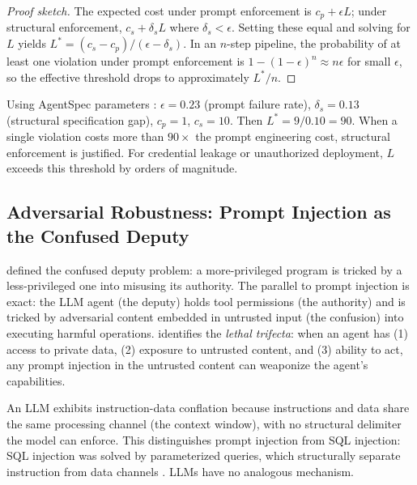 \begin{proof}[Proof sketch]
The expected cost under prompt enforcement is $c_p + \epsilon L$; under structural enforcement, $c_s + \delta_s L$ where $\delta_s < \epsilon$. Setting these equal and solving for $L$ yields $L^* = (c_s - c_p)/(\epsilon - \delta_s)$. In an $n$-step pipeline, the probability of at least one violation under prompt enforcement is $1 - (1-\epsilon)^n \approx n\epsilon$ for small $\epsilon$, so the effective threshold drops to approximately $L^*/n$.
\end{proof}

Using AgentSpec parameters \citep{wang2026agentspec}: $\epsilon = 0.23$ (prompt failure rate), $\delta_s = 0.13$ (structural specification gap), $c_p = 1$, $c_s = 10$. Then $L^* = 9/0.10 = 90$. When a single violation costs more than $90\times$ the prompt engineering cost, structural enforcement is justified. For credential leakage or unauthorized deployment, $L$ exceeds this threshold by orders of magnitude.

\subsection{Adversarial Robustness: Prompt Injection as the Confused Deputy}

\citet{hardy1988confused} defined the confused deputy problem: a more-privileged program is tricked by a less-privileged one into misusing its authority. The parallel to prompt injection is exact: the LLM agent (the deputy) holds tool permissions (the authority) and is tricked by adversarial content embedded in untrusted input (the confusion) into executing harmful operations. \citet{willison2024trifecta} identifies the \emph{lethal trifecta}: when an agent has (1) access to private data, (2) exposure to untrusted content, and (3) ability to act, any prompt injection in the untrusted content can weaponize the agent's capabilities.

\begin{definition}
\label{def:conflation-sec}
An LLM exhibits instruction-data conflation because instructions and data share the same processing channel (the context window), with no structural delimiter the model can enforce. This distinguishes prompt injection from SQL injection: SQL injection was solved by parameterized queries, which structurally separate instruction from data channels \citep{ncsc2023prompt}. LLMs have no analogous mechanism.
\end{definition}

